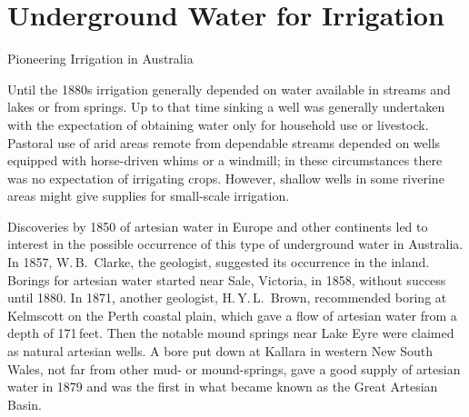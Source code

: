 
\setcounter{endnote}{0}

\chapter{Underground Water for Irrigation}
\label{ch:underground}
%
{Pioneering Irrigation in Australia}

Until the 1880s irrigation generally depended on water available in
streams and lakes or from springs.  Up to that time sinking a well was
generally undertaken with the expectation of obtaining water only for
household use or livestock.  Pastoral use of arid areas remote from
dependable streams depended on wells equipped with horse-driven whims
or a windmill; in these circumstances there was no expectation of
irrigating crops.  However, shallow wells in some riverine areas might
give supplies for small-scale irrigation.

Discoveries by 1850 of artesian water  in Europe
and other continents led to interest in the possible occurrence of
this type of underground water in Australia.  In 1857, W.\,B.~Clarke,
  the geologist, suggested its occurrence in the
inland. Borings for artesian water started near Sale,  Victoria, in 1858, without success until 1880.  In 1871, another
geologist, H.\,Y.\,L.~Brown,  recommended
boring at Kelmscott  on the Perth coastal plain,
which gave a flow of artesian water from a depth of 171\,feet.  Then
the notable mound springs  near Lake Eyre
 were claimed as natural artesian wells. A bore put
down at Kallara
 in western New South Wales, not far from other
mud- or mound-springs, gave a good supply of artesian water in 1879
and was the first in what became known as the Great Artesian
 Basin.

